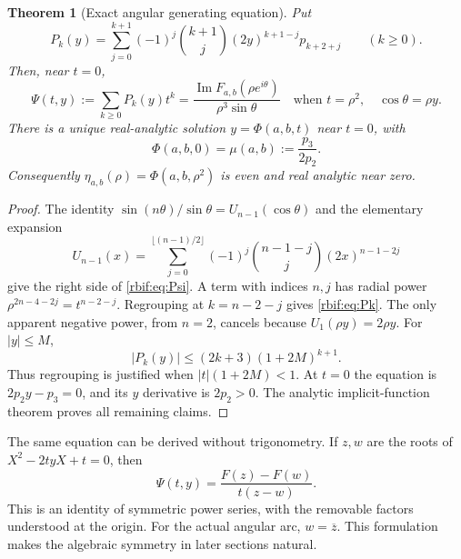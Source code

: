 \documentclass[11pt,a4paper]{article}
\newtheorem{theorem}{Theorem}[section]
\theoremstyle{definition}\newtheorem{definition}[theorem]{Definition}
\theoremstyle{remark}\newtheorem{remark}[theorem]{Remark}
\newcommand{\rbIm}{\operatorname{Im}}
\numberwithin{equation}{section}
\begin{document}
\begin{theorem}[Exact angular generating equation]
\label{rbif:thm:generating}
Put
\begin{equation}
 P_k(y)=\sum_{j=0}^{k+1}(-1)^j\binom{k+1}{j}
             (2y)^{k+1-j}p_{k+2+j}\qquad(k\ge0).
 \label{rbif:eq:Pk}
\end{equation}
Then, near $t=0$,
\begin{equation}
 \Psi(t,y):=\sum_{k\ge0}P_k(y)t^k
 =\frac{\rbIm F_{a,b}(\rho e^{i\theta})}{\rho^3\sin\theta}
 \quad\text{when }t=\rho^2,\quad\cos\theta=\rho y.
 \label{rbif:eq:Psi}
\end{equation}
There is a unique real-analytic solution $y=\Phi(a,b,t)$ near $t=0$,
with
\begin{equation}
 \Phi(a,b,0)=\mu(a,b):=\frac{p_3}{2p_2}.
 \label{rbif:eq:mu}
\end{equation}
Consequently $\eta_{a,b}(\rho)=\Phi(a,b,\rho^2)$ is even and real
analytic near zero.
\end{theorem}
\begin{proof}
The identity
$\sin(n\theta)/\sin\theta=U_{n-1}(\cos\theta)$ and the elementary
expansion
\[
 U_{n-1}(x)=\sum_{j=0}^{\lfloor(n-1)/2\rfloor}
          (-1)^j\binom{n-1-j}{j}(2x)^{n-1-2j}
\]
give the right side of \eqref{rbif:eq:Psi}. A term with indices $n,j$
has radial power $\rho^{2n-4-2j}=t^{n-2-j}$. Regrouping at
$k=n-2-j$ gives \eqref{rbif:eq:Pk}. The only apparent negative power,
from $n=2$, cancels because $U_1(\rho y)=2\rho y$.
For $|y|\le M$,
\begin{equation}
 |P_k(y)|\le (2k+3)(1+2M)^{k+1}.
 \label{rbif:eq:majorant}
\end{equation}
Thus regrouping is justified when $|t|(1+2M)<1$. At $t=0$ the
equation is $2p_2y-p_3=0$, and its $y$ derivative is $2p_2>0$.
The analytic implicit-function theorem proves all remaining claims.
\end{proof}

The same equation can be derived without trigonometry. If $z,w$ are
the roots of $X^2-2tyX+t=0$, then
\[
 \Psi(t,y)=\frac{F(z)-F(w)}{t(z-w)}.
\]
This is an identity of symmetric power series, with the removable factors
understood at the origin. For the actual angular arc, $w=\overline z$.
This formulation makes the algebraic symmetry in later sections natural.
\end{document}
